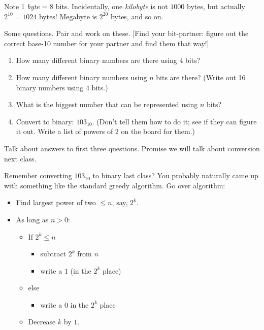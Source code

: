 \documentclass{article}
\newcommand{\notready}{\textcolor{red}{\XSolidBold}\xspace}
\newcommand{\shortdayname}{%
  \ifthenelse{\equal{\datedayname}{Thursday}}{Th}{\StrLeft{\datedayname}{1}}}
\newcommand{\shortmonthname}{\StrLeft{\datemonthname}{3}}
\newcommand{\showdate}{\thedateday\ \shortmonthname}
\newcommand{\showdowdate}{\shortdayname\ \showdate}
\newcommand{\advanceMWF}{
  \ifthenelse{\equal{\datedayname}{Monday}}
  {\nextdate\nextdate}
  {\ifthenelse{\equal{\datedayname}{Wednesday}}
    {\nextdate\nextdate}
    {\ifthenelse{\equal{\datedayname}{Thursday}}
      {\nextdate}
      {\nextdate\nextdate\nextdate}}}}
\newcommand{\firstclass}[1]{\section*{#1 (\showdowdate)}}
\newcommand{\class}[1]{\advanceMWF\firstclass{#1}}
\begin{document}
Note 1 \emph{byte} = 8 bits.  Incidentally, one \emph{kilobyte} is not
$1000$ bytes, but actually $2^{10} = 1024$ bytes!  Megabyte is
$2^{20}$ bytes, and so on.

Some questions.  Pair and work on these. [Find your bit-partner:
figure out the correct base-10 number for your partner and find them
that way!]

\begin{enumerate}
\item How many different binary numbers are there using $4$ bits?
\item How many different binary numbers using $n$ bits are there?
  (Write out 16 binary numbers using $4$ bits.)
\item What is the biggest number that can be represented using $n$
  bits?
\item Convert to binary: $103_{10}$. (Don't tell them how to do it;
  see if they can figure it out.  Write a list of powers of 2 on the
  board for them.)
\end{enumerate}

Talk about answers to first three questions.  Promise we will talk
about conversion next class.



Remember converting $103_{10}$ to binary last class?  You probably
naturally came up with something like the standard greedy algorithm.
Go over algorithm:

\begin{itemize}
\item Find largest power of two $\leq n$, say, $2^k$.
\item As long as $n > 0$:
  \begin{itemize}
  \item If $2^k \leq n$
    \begin{itemize}
    \item subtract $2^k$ from $n$
    \item write a $1$ (in the $2^k$ place)
    \end{itemize}
  \item else
    \begin{itemize}
    \item  write a $0$ in the $2^k$ place
    \end{itemize}
  \item Decrease $k$ by $1$.
  \end{itemize}
\end{itemize}
\end{document}

